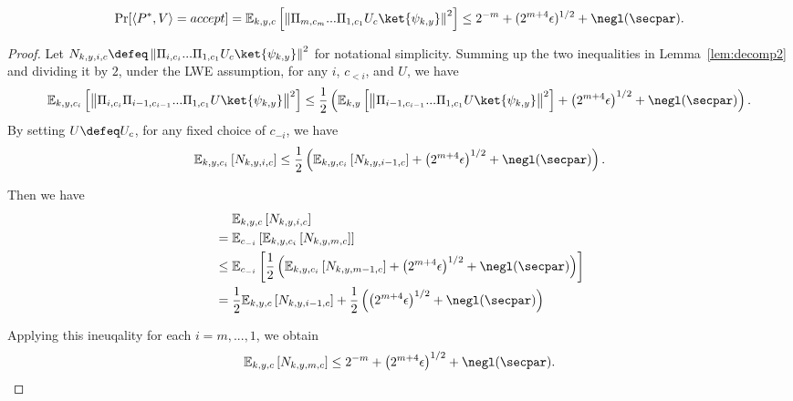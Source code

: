\begin{theorem}
\begin{align*}
\Pr[\langle P^*,V \rangle=accept]=\mathbb{E}_{k,y,c}\left[\left\|\Pi_{m,c_m}...\Pi_{1,c_1}U_{c}\ket{\psi_{k,y}}\right\|^{2}\right]\leq 2^{-m}+(2^{m+4}\epsilon)^{1/2} +\negl(\secpar).
\end{align*}
\end{theorem}
\begin{proof}
Let $N_{k,y,i,c}\defeq \left\|\Pi_{i,c_i}...\Pi_{1,c_1}U_{c}\ket{\psi_{k,y}}\right\|^{2}$ for notational simplicity.
Summing up the two inequalities in Lemma~\ref{lem:decomp2} and dividing it by $2$, under the LWE assumption, for any $i$, $c_{<i}$, and $U$, we have 
\begin{align*}
     \mathbb{E}_{k,y,c_i}\left[\left\|\Pi_{i,c_i}\Pi_{i-1,c_{i-1}}...\Pi_{1,c_1}U\ket{\psi_{k,y}}\right\|^{2}\right]\leq \frac{1}{2}\left(\mathbb{E}_{k,y}\left[\left\|\Pi_{i-1,c_{i-1}}...\Pi_{1,c_1}U\ket{\psi_{k,y}}\right\|^{2}\right]+\left(2^{m+4}\epsilon\right)^{1/2}+\negl(\secpar)\right).  
\end{align*}
By setting $U\defeq U_c$, for any fixed choice of $c_{-i}$, we have
\begin{align*}
\mathbb{E}_{k,y,c_{i}}\left[N_{k,y,i,c}\right]\leq \frac{1}{2}\left(\mathbb{E}_{k,y,c_i}\left[N_{k,y,i-1,c}\right]+\left(2^{m+4}\epsilon\right)^{1/2}+\negl(\secpar)\right).
\end{align*}

Then we have
\begin{align*}
 &~~~~\mathbb{E}_{k,y,c}\left[N_{k,y,i,c}\right]\\
 &=  \mathbb{E}_{c_{-i}}\left[\mathbb{E}_{k,y,c_i}\left[N_{k,y,m,c}\right]\right]\\
 &\leq \mathbb{E}_{c_{-i}}\left[\frac{1}{2}\left(\mathbb{E}_{k,y,c_i}\left[N_{k,y,m-1,c}\right]+\left(2^{m+4}\epsilon\right)^{1/2}+\negl(\secpar)\right)\right]\\
 &=\frac{1}{2}\mathbb{E}_{k,y,c}\left[N_{k,y,i-1,c}\right]+\frac{1}{2}\left(\left(2^{m+4}\epsilon\right)^{1/2}+\negl(\secpar)\right)
\end{align*}

Applying this ineuqality for each $i=m,...,1$, we obtain
\begin{align*}
\mathbb{E}_{k,y,c}\left[N_{k,y,m,c}\right]\leq 2^{-m}+\left(2^{m+4}\epsilon\right)^{1/2}+\negl(\secpar).
\end{align*}
\end{proof}


